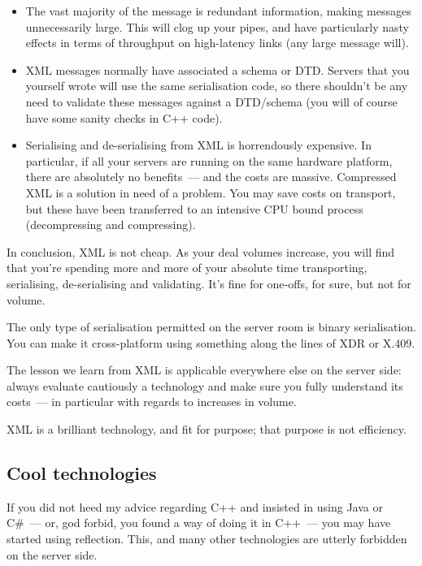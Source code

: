 \documentclass{memoir}
\begin{document}
\begin{itemize}
\item The vast majority of the message is redundant information,
  making messages unnecessarily large. This will clog up your pipes,
  and have particularly nasty effects in terms of throughput on
  high-latency links (any large message will).
\item XML messages normally have associated a schema or DTD. Servers
  that you yourself wrote will use the same serialisation code, so
  there shouldn't be any need to validate these messages against a
  DTD/schema (you will of course have some sanity checks in C++ code).
\item Serialising and de-serialising from XML is horrendously
  expensive. In particular, if all your servers are running on the
  same hardware platform, there are absolutely no benefits~--- and the
  costs are massive.  Compressed XML is a solution in need of a
  problem. You may save costs on transport, but these have been
  transferred to an intensive CPU bound process (decompressing and
  compressing).
\end{itemize}

In conclusion, XML is not cheap. As your deal volumes increase, you
will find that you're spending more and more of your absolute time
transporting, serialising, de-serialising and validating. It's fine
for one-offs, for sure, but not for volume.

The only type of serialisation permitted on the server room is binary
serialisation. You can make it cross-platform using something along
the lines of XDR or X.409.

The lesson we learn from XML is applicable everywhere else on the
server side: always evaluate cautiously a technology and make sure you
fully understand its costs~--- in particular with regards to increases
in volume.

XML is a brilliant technology, and fit for purpose; that purpose is
not efficiency.

\subsection{Cool technologies}

If you did not heed my advice regarding C++ and insisted in using Java
or C\#~--- or, god forbid, you found a way of doing it in C++~--- you
may have started using reflection. This, and many other technologies
are utterly forbidden on the server side.
\end{document}
